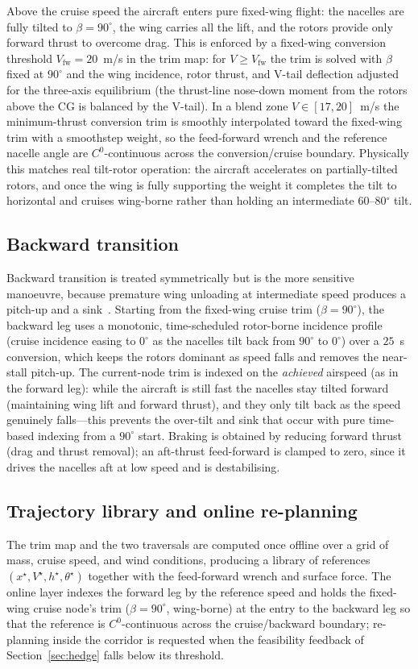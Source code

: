 \documentclass[preprint,3p,11pt]{elsarticle}
\begin{document}
Above the cruise speed the aircraft enters pure fixed-wing flight: the nacelles
are fully tilted to $\beta=90^\circ$, the wing carries all the lift, and the
rotors provide only forward thrust to overcome drag.  This is enforced by a
fixed-wing conversion threshold $V_{\mathrm{fw}}=20$~m/s in the trim map: for
$V\ge V_{\mathrm{fw}}$ the trim is solved with $\beta$ fixed at $90^\circ$ and
the wing incidence, rotor thrust, and V-tail deflection adjusted for the
three-axis equilibrium (the thrust-line nose-down moment from the rotors above
the CG is balanced by the V-tail).  In a blend zone
$V\in[17,20]$~m/s the minimum-thrust conversion trim is smoothly interpolated
toward the fixed-wing trim with a smoothstep weight, so the feed-forward wrench
and the reference nacelle angle are $C^0$-continuous across the
conversion/cruise boundary.  Physically this matches real tilt-rotor operation:
the aircraft accelerates on partially-tilted rotors, and once the wing is
fully supporting the weight it completes the tilt to horizontal and cruises
wing-borne rather than holding an intermediate 60--80$^\circ$ tilt.

\subsection{Backward transition}\label{sec:backward}
Backward transition is treated symmetrically but is the more sensitive
manoeuvre, because premature wing unloading at intermediate speed produces a
pitch-up and a sink~\cite{may2025backward}. Starting from the fixed-wing cruise
trim ($\beta=90^\circ$), the backward leg uses a monotonic, time-scheduled
rotor-borne incidence profile (cruise incidence easing to $0^\circ$ as the
nacelles tilt back from $90^\circ$ to $0^\circ$) over a $25$~s conversion,
which keeps the rotors dominant as speed falls and removes the near-stall
pitch-up.  The current-node trim is indexed on the \emph{achieved} airspeed
(as in the forward leg): while the aircraft is still fast the nacelles stay
tilted forward (maintaining wing lift and forward thrust), and they only tilt
back as the speed genuinely falls---this prevents the over-tilt and sink that
occur with pure time-based indexing from a $90^\circ$ start.  Braking is
obtained by reducing forward thrust (drag and thrust removal); an aft-thrust
feed-forward is clamped to zero, since it drives the nacelles aft at low speed
and is destabilising.

\subsection{Trajectory library and online re-planning}\label{sec:library}
The trim map and the two traversals are computed once offline over a grid of
mass, cruise speed, and wind conditions, producing a library of references
$(x^\star,V^\star,h^\star,\theta^\star)$ together with the feed-forward
wrench and surface force. The online layer indexes the forward leg by the
reference speed and holds the fixed-wing cruise node's trim
($\beta=90^\circ$, wing-borne) at the entry to the backward leg so that the
reference is $C^0$-continuous across the cruise/backward boundary; re-planning
inside the corridor is requested when the feasibility feedback of
Section~\ref{sec:hedge} falls below its threshold.
\end{document}
